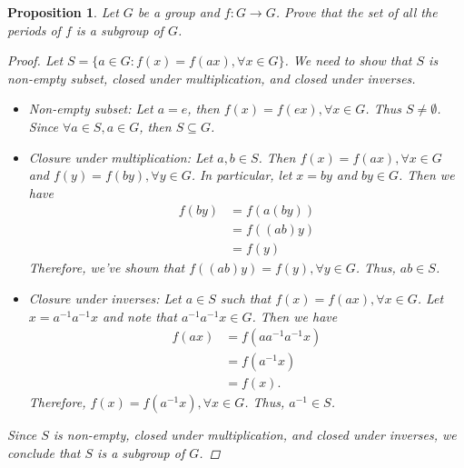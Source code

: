 \documentclass[12pt]{article}
\newtheorem{proposition}{Proposition}
\begin{document}
\begin{proposition}
  Let $G$ be a group and $f: G \to G$. Prove that the set of all the periods of $f$
  is a subgroup of $G$.
  \begin{proof}
    Let $S = \{a \in G : f(x) = f(ax), \forall x \in G\}$.
    We need to show that $S$ is non-empty subset, closed under multiplication, and closed under inverses.
    \begin{itemize}
      \item Non-empty subset:
            Let $a = e$, then $f(x) = f(ex), \forall x \in G$.
            Thus $S \neq \emptyset$. Since $\forall a \in S, a \in G$, then $S \subseteq G$.
      \item Closure under multiplication:
            Let $a, b \in S$.
            Then $f(x) = f(ax), \forall x \in G$ and $f(y) = f(by), \forall y \in G$.
            In particular, let $x = by$ and $by \in G$.
            Then we have
            \begin{align*}
              f(by) & = f(a(by)) \\
                    & = f((ab)y) \\
                    & = f(y)
            \end{align*}
            Therefore, we've shown that $f((ab)y) = f(y), \forall y \in G$.
            Thus, $ab \in S$.
      \item Closure under inverses:
            Let $a \in S$ such that $f(x) = f(ax), \forall x \in G$.
            Let $x = a^{-1}a^{-1}x$ and note that $a^{-1}a^{-1}x \in G$.
            Then we have
            \begin{align*}
              f(ax) & = f(aa^{-1}a^{-1}x) \\
                    & = f(a^{-1}x)        \\
                    & = f(x).
            \end{align*}
            Therefore, $f(x) = f(a^{-1}x), \forall x \in G$.
            Thus, $a^{-1} \in S$.
    \end{itemize}
    Since $S$ is non-empty, closed under multiplication, and closed under inverses, we conclude that $S$ is a subgroup of $G$.
  \end{proof}
\end{proposition}


\end{document}
